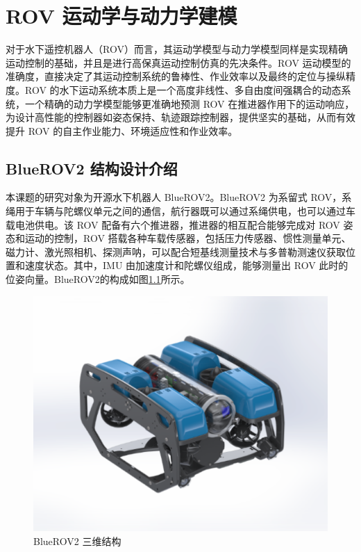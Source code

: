 \chapter{ROV 运动学与动力学建模}

对于水下遥控机器人（ROV）而言，其运动学模型与动力学模型同样是实现精确运动控制的基础，并且是进行高保真运动控制仿真的先决条件。ROV 运动模型的准确度，直接决定了其运动控制系统的鲁棒性、作业效率以及最终的定位与操纵精度。ROV 的水下运动系统本质上是一个高度非线性、多自由度间强耦合的动态系统，一个精确的动力学模型能够更准确地预测 ROV 在推进器作用下的运动响应，为设计高性能的控制器如姿态保持、轨迹跟踪控制器，提供坚实的基础，从而有效提升 ROV 的自主作业能力、环境适应性和作业效率。

\section{BlueROV2 结构设计介绍}

本课题的研究对象为开源水下机器人 BlueROV2\cite{huDisturbanceObserverBasedModel2024}。BlueROV2 为系留式 ROV，系绳用于车辆与陀螺仪单元之间的通信，航行器既可以通过系绳供电，也可以通过车载电池供电。该 ROV 配备有六个推进器，推进器的相互配合能够完成对 ROV 姿态和运动的控制，ROV 搭载各种车载传感器，包括压力传感器、惯性测量单元、磁力计、激光照相机、探测声呐，可以配合短基线测量技术与多普勒测速仪获取位置和速度状态。其中，IMU 由加速度计和陀螺仪组成，能够测量出 ROV 此时的位姿向量。BlueROV2的构成如图\ref{f.BlueROV2}所示。

\begin{figure}[hbt]
    \centering
    \includegraphics[width=0.6\linewidth]{images/chapter2/bluerov.png}
    \caption{BlueROV2 三维结构}
    \label{f.BlueROV2}
\end{figure}

